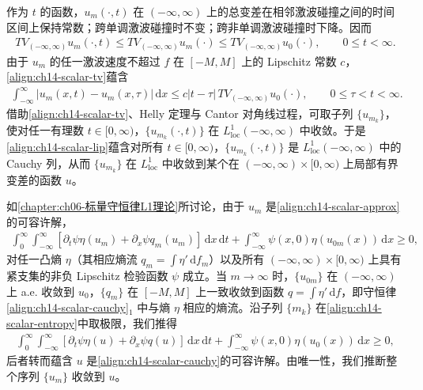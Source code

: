 \documentclass[../../main.tex]{subfiles}
\begin{document}
作为 $t$ 的函数，$u_m(\cdot,t)$ 在 $(-\infty,\infty)$ 上的总变差在相邻激波碰撞之间的时间区间上保持常数；跨单调激波碰撞时不变；跨非单调激波碰撞时下降。因而
\begin{align}
TV_{(-\infty,\infty)}u_m(\cdot,t)\leqslant TV_{(-\infty,\infty)}u_m(\cdot)\leqslant TV_{(-\infty,\infty)}u_0(\cdot),\qquad 0\leqslant t<\infty.
\label{align:ch14-scalar-tv}
\end{align}
由于 $u_m$ 的任一激波速度不超过 $f$ 在 $[-M,M]$ 上的 Lipschitz 常数 $c$，\eqref{align:ch14-scalar-tv}蕴含
\begin{align}
\int_{-\infty}^{\infty}|u_m(x,t)-u_m(x,\tau)|\,\mathrm{d}x\leqslant c|t-\tau|\,TV_{(-\infty,\infty)}u_0(\cdot),\qquad 0\leqslant\tau<t<\infty.
\label{align:ch14-scalar-lip}
\end{align}
借助\eqref{align:ch14-scalar-tv}、Helly 定理与 Cantor 对角线过程，可取子列 $\{u_{m_k}\}$，使对任一有理数 $t\in[0,\infty)$，$\{u_{m_k}(\cdot,t)\}$ 在 $L^1_{\mathrm{loc}}(-\infty,\infty)$ 中收敛。于是\eqref{align:ch14-scalar-lip}蕴含对所有 $t\in[0,\infty)$，$\{u_{m_k}(\cdot,t)\}$ 是 $L^1_{\mathrm{loc}}(-\infty,\infty)$ 中的 Cauchy 列，从而 $\{u_{m_k}\}$ 在 $L^1_{\mathrm{loc}}$ 中收敛到某个在 $(-\infty,\infty)\times[0,\infty)$ 上局部有界变差的函数 $u$。

如\cref{chapter:ch06-标量守恒律L1理论}所讨论，由于 $u_m$ 是\eqref{align:ch14-scalar-approx}的可容许解，
\begin{align}
\int_0^\infty\int_{-\infty}^\infty[\partial_t\psi\eta(u_m)+\partial_x\psi q_m(u_m)]\,\mathrm{d}x\,\mathrm{d}t+\int_{-\infty}^\infty\psi(x,0)\eta(u_{0m}(x))\,\mathrm{d}x\geqslant 0,
\label{align:ch14-scalar-entropy}
\end{align}
对任一凸熵 $\eta$（其相应熵流 $q_m=\int\eta'\,\mathrm{d}f_m$）以及所有 $(-\infty,\infty)\times[0,\infty)$ 上具有紧支集的非负 Lipschitz 检验函数 $\psi$ 成立。当 $m\to\infty$ 时，$\{u_{0m}\}$ 在 $(-\infty,\infty)$ 上 a.e. 收敛到 $u_0$，$\{q_m\}$ 在 $[-M,M]$ 上一致收敛到函数 $q=\int\eta'\,\mathrm{d}f$，即守恒律\eqref{align:ch14-scalar-cauchy}$_1$ 中与熵 $\eta$ 相应的熵流。沿子列 $\{m_k\}$ 在\eqref{align:ch14-scalar-entropy}中取极限，我们推得
\begin{align}
\int_0^\infty\int_{-\infty}^\infty[\partial_t\psi\eta(u)+\partial_x\psi q(u)]\,\mathrm{d}x\,\mathrm{d}t+\int_{-\infty}^\infty\psi(x,0)\eta(u_0(x))\,\mathrm{d}x\geqslant 0,
\label{align:ch14-scalar-entropy-limit}
\end{align}
后者转而蕴含 $u$ 是\eqref{align:ch14-scalar-cauchy}的可容许解。由唯一性，我们推断整个序列 $\{u_m\}$ 收敛到 $u$。
\end{document}
